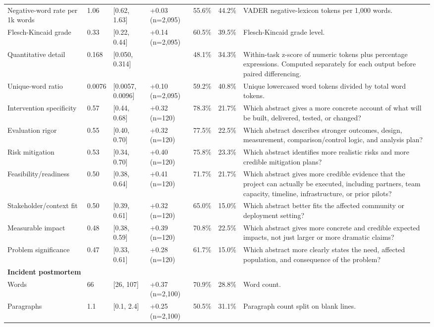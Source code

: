 \begin{longtable}{lllllll}
Negative-word rate per 1k words & 1.06 & [0.62, 1.63] & +0.03 (n=2,095) & 55.6\% & 44.2\% & VADER negative-lexicon tokens per 1,000 words. \\
Flesch-Kincaid grade & 0.33 & [0.22, 0.44] & +0.14 (n=2,095) & 60.5\% & 39.5\% & Flesch-Kincaid grade level. \\
Quantitative detail & 0.168 & [0.050, 0.314] &  & 48.1\% & 34.3\% & Within-task z-score of numeric tokens plus percentage expressions. Computed separately for each output before paired differencing. \\
Unique-word ratio & 0.0076 & [0.0057, 0.0096] & +0.10 (n=2,095) & 59.2\% & 40.8\% & Unique lowercased word tokens divided by total word tokens. \\
Intervention specificity & 0.57 & [0.44, 0.68] & +0.32 (n=120) & 78.3\% & 21.7\% & Which abstract gives a more concrete account of what will be built, delivered, tested, or changed? \\
Evaluation rigor & 0.55 & [0.40, 0.70] & +0.32 (n=120) & 77.5\% & 22.5\% & Which abstract describes stronger outcomes, design, measurement, comparison/control logic, and analysis plan? \\
Risk mitigation & 0.53 & [0.34, 0.70] & +0.40 (n=120) & 75.8\% & 23.3\% & Which abstract identifies more realistic risks and more credible mitigation plans? \\
Feasibility/readiness & 0.50 & [0.38, 0.64] & +0.41 (n=120) & 71.7\% & 21.7\% & Which abstract gives more credible evidence that the project can actually be executed, including partners, team capacity, timeline, infrastructure, or prior pilots? \\
Stakeholder/context fit & 0.50 & [0.39, 0.61] & +0.32 (n=120) & 65.0\% & 15.0\% & Which abstract better fits the affected community or deployment setting? \\
Measurable impact & 0.48 & [0.38, 0.59] & +0.39 (n=120) & 70.8\% & 22.5\% & Which abstract gives more concrete and credible expected impacts, not just larger or more dramatic claims? \\
Problem significance & 0.47 & [0.33, 0.61] & +0.28 (n=120) & 61.7\% & 15.0\% & Which abstract more clearly states the need, affected population, and consequence of the problem? \\
\multicolumn{7}{l}{\textbf{Incident postmortem}} \\
Words & 66 & [26, 107] & +0.37 (n=2,100) & 70.9\% & 28.8\% & Word count. \\
Paragraphs & 1.1 & [0.1, 2.4] & +0.25 (n=2,100) & 50.5\% & 31.1\% & Paragraph count split on blank lines. \\

\end{longtable}
